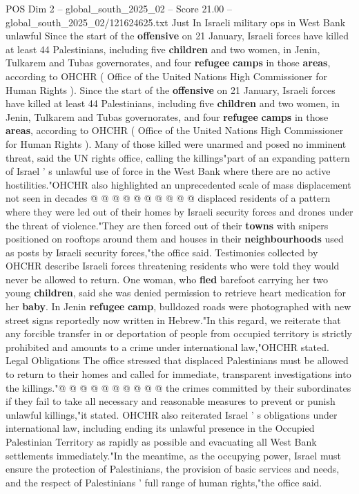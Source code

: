 \begin{textsample}{POS Dim 2 – global\_south\_2025\_02 – Score 21.00 – global\_south\_2025\_02/121624625.txt}  \label{ex:f2_pos_423}
Just In Israeli military ops in West Bank unlawful Since the start of the \textbf{offensive} on 21 January, Israeli forces have killed at least 44 Palestinians, including five \textbf{children} and two women, in Jenin, Tulkarem and Tubas governorates, and four \textbf{refugee} \textbf{camps} in those \textbf{areas}, according to OHCHR ( Office of the United Nations High Commissioner for Human Rights ).
Since the start of the \textbf{offensive} on 21 January, Israeli forces have killed at least 44 Palestinians, including five \textbf{children} and two women, in Jenin, Tulkarem and Tubas governorates, and four \textbf{refugee} \textbf{camps} in those \textbf{areas}, according to OHCHR ( Office of the United Nations High Commissioner for Human Rights ).
Many of those killed were unarmed and posed no imminent threat, said the UN rights office, calling the killings"part of an expanding pattern of Israel ' s unlawful use of force in the West Bank where there are no active hostilities."OHCHR also highlighted an unprecedented scale of mass displacement not seen in decades @ @ @ @ @ @ @ @ @ @ displaced residents of a pattern where they were led out of their homes by Israeli security forces and drones under the threat of violence."They are then forced out of their \textbf{towns} with snipers positioned on rooftops around them and houses in their \textbf{neighbourhoods} used as posts by Israeli security forces,"the office said.
Testimonies collected by OHCHR describe Israeli forces threatening residents who were told they would never be allowed to return.
One woman, who \textbf{fled} barefoot carrying her two young \textbf{children}, said she was denied permission to retrieve heart medication for her \textbf{baby}.
In Jenin \textbf{refugee} \textbf{camp}, bulldozed roads were photographed with new street signs reportedly now written in Hebrew."In this regard, we reiterate that any forcible transfer in or deportation of people from occupied territory is strictly prohibited and amounts to a crime under international law,"OHCHR stated.
Legal Obligations The office stressed that displaced Palestinians must be allowed to return to their homes and called for immediate, transparent investigations into the killings."@ @ @ @ @ @ @ @ @ @ the crimes committed by their subordinates if they fail to take all necessary and reasonable measures to prevent or punish unlawful killings,"it stated.
OHCHR also reiterated Israel ' s obligations under international law, including ending its unlawful presence in the Occupied Palestinian Territory as rapidly as possible and evacuating all West Bank settlements immediately."In the meantime, as the occupying power, Israel must ensure the protection of Palestinians, the provision of basic services and needs, and the respect of Palestinians ' full range of human rights,"the office said.

\end{textsample}
